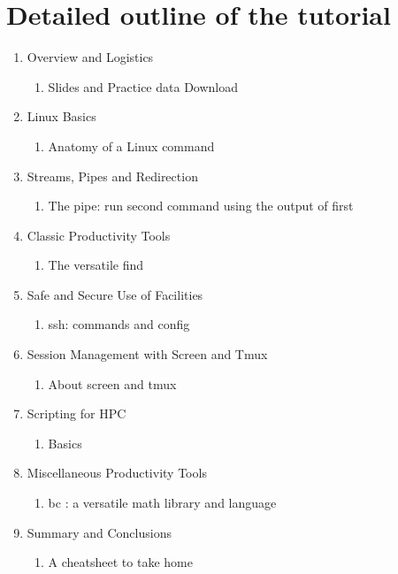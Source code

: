 \documentclass{report}
\begin{document}
\section*{Detailed outline of the tutorial}
\begin{enumerate}
\item Overview and Logistics
  \begin{enumerate}
    \item Slides and Practice data Download
  \end{enumerate}
\item Linux Basics
  \begin{enumerate}
    \item Anatomy of a Linux command
  \end{enumerate}
\item Streams, Pipes and Redirection
  \begin{enumerate}
    \item The pipe: run second command using the output of first
  \end{enumerate}
\item Classic Productivity Tools
  \begin{enumerate}
    \item The versatile find
  \end{enumerate}
\item Safe and Secure Use of Facilities
  \begin{enumerate}
    \item ssh: commands and config
  \end{enumerate}
\item Session Management with Screen and Tmux
  \begin{enumerate}
    \item About screen and tmux
  \end{enumerate}
\item Scripting for HPC
  \begin{enumerate}
    \item Basics
  \end{enumerate}
\item Miscellaneous Productivity Tools
  \begin{enumerate}
    \item bc : a versatile math library and language
  \end{enumerate}
\item Summary and Conclusions
  \begin{enumerate}
    \item A cheatsheet to take home
  \end{enumerate}
\end{enumerate}
\end{document}
